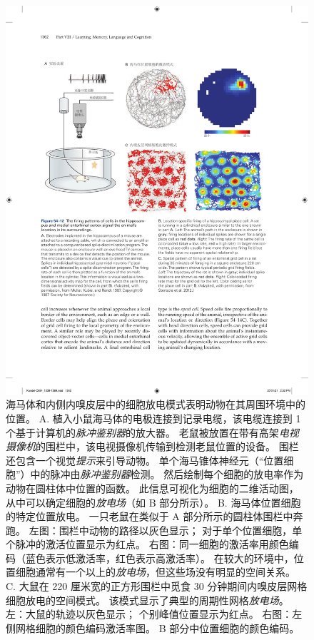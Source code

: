 \begin{figure}[htbp]
	\centering
	\includegraphics[width=1.0\linewidth]{chap54/fig_54_12}
	\caption{海马体和内侧内嗅皮层中的细胞放电模式表明动物在其周围环境中的位置。
		A. 植入小鼠海马体的电极连接到记录电缆，该电缆连接到 1 个基于计算机的\textit{脉冲鉴别器}的放大器。
		老鼠被放置在带有高架\textit{电视摄像机}的围栏中，该电视摄像机传输到检测老鼠位置的设备。
		围栏还包含一个视觉\textit{提示}来引导动物。
		单个海马锥体神经元（“位置细胞”）中的脉冲由\textit{脉冲鉴别器}检测。
		然后绘制每个细胞的放电率作为动物在圆柱体中位置的函数。
		此信息可视化为细胞的二维活动图，从中可以确定细胞的\textit{放电场}（如 B 部分所示）\cite{muller1987spatial}。
		B. 海马体位置细胞的特定位置放电。
		一只老鼠在类似于 A 部分所示的圆柱体围栏中奔跑。
		左图：围栏中动物的路径以灰色显示；
		对于单个位置细胞，单个脉冲的激活位置显示为红点。
		右图：同一细胞的激活率用颜色编码（蓝色表示低激活率，红色表示高激活率）。
		在较大的环境中，位置细胞通常有一个以上的\textit{放电场}，但这些场没有明显的空间关系。
		C. 大鼠在 220 厘米宽的正方形围栏中觅食 30 分钟期间内嗅皮层网格细胞放电的空间模式。
		该模式显示了典型的周期性网格\textit{放电场}。
		左：大鼠的轨迹以灰色显示；
		个别峰值位置显示为红点。
		右图：左侧网格细胞的颜色编码激活率图。
		B 部分中位置细胞的颜色编码\cite{stensola2012entorhinal}。}
	\label{fig:54_12}
\end{figure}


